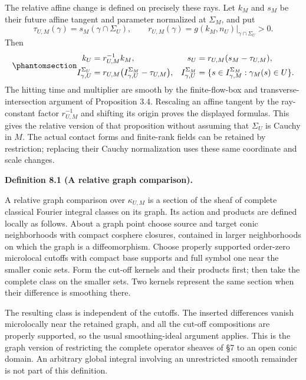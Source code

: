 \documentclass[
  english,
  11pt,
  reqno]{amsart}
\makeatletter
\newcommand{\pandocstatementheading}[1]{%
  \par\addpenalty{\@beginparpenalty}%
  \addvspace{.5\baselineskip plus .2\baselineskip minus .2\baselineskip}%
  {\normalfont\bfseries #1\par}%
  \nobreak\@afterindenttrue\@afterheading
}
\makeatother
\begin{document}
The relative affine change is defined on precisely these rays. Let
\(k_M\) and \(s_M\) be their future affine tangent and parameter
normalized at \(\Sigma_M\), and put \[
\tau_{U,M}(\gamma)=s_M(\gamma\cap\Sigma_U),
\qquad
r_{U,M}(\gamma)=g(k_M,n_U)|_{\gamma\cap\Sigma_U}>0.
\] Then
\begin{equation}\protect\phantomsection\label{eq:relative-affine-normalization}{
\begin{aligned}
k_U&=r_{U,M}^{-1}k_M,
&s_U&=r_{U,M}(s_M-\tau_{U,M}),\\
I_{\gamma,U}^{\Sigma_U}
&=r_{U,M}\bigl(I_{\gamma,U}^{\Sigma_M}-\tau_{U,M}\bigr),
&I_{\gamma,U}^{\Sigma_M}
&=\{s\in I_{\gamma,M}^{\Sigma_M}:\gamma_M(s)\in U\}.
\end{aligned}
}\end{equation} The hitting time and multiplier are smooth by the
finite-flow-box and transverse-intersection argument of Proposition 3.4.
Rescaling an affine tangent by the ray-constant factor \(r_{U,M}^{-1}\)
and shifting its origin proves the displayed formulas. This gives the
relative version of that proposition without assuming that \(\Sigma_U\)
is Cauchy in \(M\). The actual contact forms and finite-rank fields can
be retained by restriction; replacing their Cauchy normalization uses
these same coordinate and scale changes.

\pandocstatementheading{\protect{}\label{def:relative-graph-comparison}Definition 8.1 (A relative graph comparison).}

A relative graph comparison over \(\kappa_{U,M}\) is a section of the
sheaf of complete classical Fourier integral classes on its graph. Its
action and products are defined locally as follows. About a graph point
choose source and target conic neighborhoods with compact cosphere
closures, contained in larger neighborhoods on which the graph is a
diffeomorphism. Choose properly supported order-zero microlocal cutoffs
with compact base supports and full symbol one near the smaller conic
sets. Form the cut-off kernels and their products first; then take the
complete class on the smaller sets. Two kernels represent the same
section when their difference is smoothing there.

The resulting class is independent of the cutoffs. The inserted
differences vanish microlocally near the retained graph, and all the
cut-off compositions are properly supported, so the usual
smoothing-ideal argument applies. This is the graph version of
restricting the complete operator sheaves of §7 to an open conic domain.
An arbitrary global integral involving an unrestricted smooth remainder
is not part of this definition.
\end{document}
